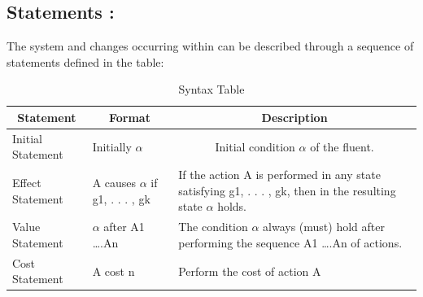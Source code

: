 \documentclass[11pt]{article}
\begin{document}
\subsection{Statements :}\label{sec:Statements} 
	The system and changes occurring within can be described through a sequence of statements defined in the table:
	\begin{table}[H]
  \centering
    \begin{tabular}{|p{2cm}|p{4cm}|p{9cm}|}
    \hline
    \multicolumn{1}{|c|}{\textbf{Statement}} & \multicolumn{1}{c|}{\textbf{Format}} & \multicolumn{1}{c|}{\textbf{Description}} \\
    \hline
    Initial Statement & Initially $\alpha$ & \multicolumn{1}{c|}{Initial condition $\alpha$ of the fluent.} \\
    \hline
    Effect Statement & A causes $\alpha$ if g1, . . . , gk & If the action A is performed in any state satisfying g1, . . . , gk, then in
    the resulting state $\alpha$ holds. \\
    \hline
    Value Statement & $\alpha$ after A1 ….An & The condition $\alpha$ always (must) hold after performing the sequence A1 ….An of actions. \\
    \hline
    Cost Statement & A cost n & Perform the cost of action A \\
    \hline
    \end{tabular}
    \caption{Syntax Table}
  \label{tab:table01}
\end{table}
\end{document}
